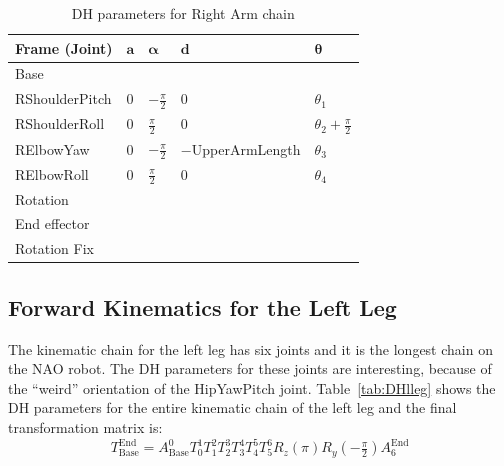 \begin{table}[!t]
\centering
\caption{DH parameters for Right Arm chain}
\begin{tabular}{|l|>{\centering\arraybackslash}m{2.55cm}|>{\centering\arraybackslash}m{2.55cm}|>{\centering\arraybackslash}m{2.85cm}|>{\centering\arraybackslash}m{2.55cm}|}
\hline
\textbf{Frame (Joint)} & $\mathbf{a}$ & $\boldsymbol{\alpha}$ & $\mathbf{d}$ & $\boldsymbol{\theta}$\\ \hline
Base & \multicolumn{4}{c|}{$A(0,\text{\footnotesize{$-$ShoulderOffsetY $-$ ElbowOffsetY}},\text{\footnotesize{ShoulderOffsetZ}})$} \\ \hline
RShoulderPitch & $0$ & $-\frac{\pi}{2}$ & $0$ & $\theta_1$ \\ \hline
RShoulderRoll & $0$ & $\frac{\pi}{2}$ & $0$ & $\theta_2 + \frac{\pi}{2}$ \\ \hline
RElbowYaw & $0$ & $-\frac{\pi}{2}$ & \footnotesize{$-$UpperArmLength} & $\theta_3$ \\ \hline
RElbowRoll & $0$ & $\frac{\pi}{2}$ & $0$ & $\theta_4$ \\ \hline
Rotation & \multicolumn{4}{c|}{$R_z(\frac{\pi}{2})$} \\ \hline
End effector & \multicolumn{4}{c|}{$A(\text{\footnotesize{$-$HandOffsetX $-$ LowerArmLength}},0,0)$} \\ \hline
Rotation Fix & \multicolumn{4}{c|}{$R_z(-\pi)$} \\ \hline
\end{tabular}
\label{tab:DHrarm}
\end{table}



\subsection{Forward Kinematics for the Left Leg}
The kinematic chain for the left leg has six joints and it is the longest chain on the NAO robot. The DH parameters for these joints are interesting, because of the ``weird'' orientation of the HipYawPitch joint. Table~\ref{tab:DHlleg} shows the DH parameters for the entire kinematic chain of the left leg and the final transformation matrix is:
\[
T^\text{End}_\text{Base} = A^0_\text{Base}T^1_0T^2_1T^3_2T^4_3T^5_4T^6_5R_z(\pi)R_y(-\tfrac{\pi}{2})A^\text{End}_{6}
\]

